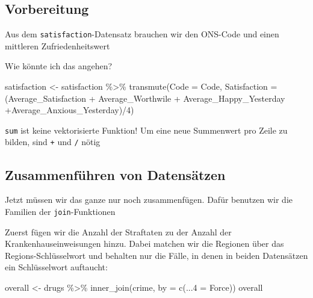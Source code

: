\documentclass[
]{book}
\newenvironment{Shaded}{\begin{snugshade}}{\end{snugshade}}
\newcommand{\AttributeTok}[1]{\textcolor[rgb]{0.77,0.63,0.00}{#1}}
\newcommand{\DecValTok}[1]{\textcolor[rgb]{0.00,0.00,0.81}{#1}}
\newcommand{\FunctionTok}[1]{\textcolor[rgb]{0.00,0.00,0.00}{#1}}
\newcommand{\NormalTok}[1]{#1}
\newcommand{\OtherTok}[1]{\textcolor[rgb]{0.56,0.35,0.01}{#1}}
\newcommand{\SpecialCharTok}[1]{\textcolor[rgb]{0.00,0.00,0.00}{#1}}
\newcommand{\StringTok}[1]{\textcolor[rgb]{0.31,0.60,0.02}{#1}}
\begin{document}
\hypertarget{vorbereitung-2}{%
\subsection{Vorbereitung}\label{vorbereitung-2}}

Aus dem \texttt{satisfaction}-Datensatz brauchen wir den ONS-Code und einen mittleren Zufriedenheitswert

Wie könnte ich das angehen?

\begin{Shaded}
\begin{Highlighting}[]
\NormalTok{satisfaction }\OtherTok{\textless{}{-}}\NormalTok{ satisfaction }\SpecialCharTok{\%\textgreater{}\%} 
  \FunctionTok{transmute}\NormalTok{(}\AttributeTok{Code =}\NormalTok{ Code,}
            \AttributeTok{Satisfaction =}\NormalTok{ (Average\_Satisfaction }\SpecialCharTok{+}\NormalTok{ Average\_Worthwile }\SpecialCharTok{+} 
\NormalTok{              Average\_Happy\_Yesterday }\SpecialCharTok{+}\NormalTok{Average\_Anxious\_Yesterday)}\SpecialCharTok{/}\DecValTok{4}\NormalTok{)}
\end{Highlighting}
\end{Shaded}

\texttt{sum} ist keine vektorisierte Funktion! Um eine neue Summenwert pro Zeile zu bilden, sind \texttt{+} und \texttt{/} nötig

\hypertarget{zusammenfuxfchren-von-datensuxe4tzen-1}{%
\subsection{Zusammenführen von Datensätzen}\label{zusammenfuxfchren-von-datensuxe4tzen-1}}

Jetzt müssen wir das ganze nur noch zusammenfügen. Dafür benutzen wir die Familien der \texttt{join}-Funktionen

Zuerst fügen wir die Anzahl der Straftaten zu der Anzahl der Krankenhauseinweisungen hinzu. Dabei matchen wir die Regionen über das Regions-Schlüsselwort und behalten nur die Fälle, in denen in beiden Datensätzen ein Schlüsselwort auftaucht:

\begin{Shaded}
\begin{Highlighting}[]
\NormalTok{overall }\OtherTok{\textless{}{-}}\NormalTok{ drugs }\SpecialCharTok{\%\textgreater{}\%} 
  \FunctionTok{inner\_join}\NormalTok{(crime, }\AttributeTok{by =} \FunctionTok{c}\NormalTok{(}\StringTok{\textquotesingle{}...4\textquotesingle{}} \OtherTok{=} \StringTok{\textquotesingle{}Force\textquotesingle{}}\NormalTok{))}
\NormalTok{overall}
\end{Highlighting}
\end{Shaded}
\end{document}
